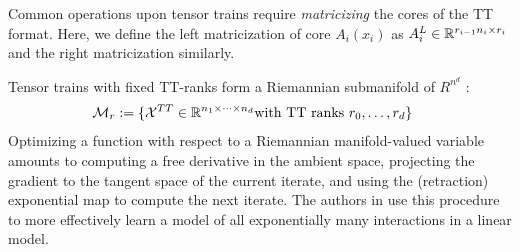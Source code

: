 Common operations upon tensor trains require \textit{matricizing} the cores of the TT format. Here, we define the left matricization of core $A_i(x_i)$ as $A_i^L \in \mathbb{R}^{r_{i-1}n_i \times r_i} $ and the right matricization similarly.

Tensor trains with fixed TT-ranks form a Riemannian submanifold of $R^{n^d}$ \cite{lubich2015time, holtz2012manifolds}:
\begin{align}\label{eq:riem}
    \mathcal{M}_r := \{ \mathcal{X}^{TT} &\in \mathbb{R}^{n_1 \times \cdots \times n_d} \text{with TT ranks } r_0,\ldots,r_d\} 
\end{align}
Optimizing a function with respect to a Riemannian manifold-valued variable amounts to computing a free derivative in the ambient space, projecting the gradient to the tangent space of the current iterate, and using the (retraction) exponential map to compute the next iterate.
The authors in \cite{novikov2016exponential} use this procedure to more effectively learn a model of all exponentially many interactions in a linear model.
